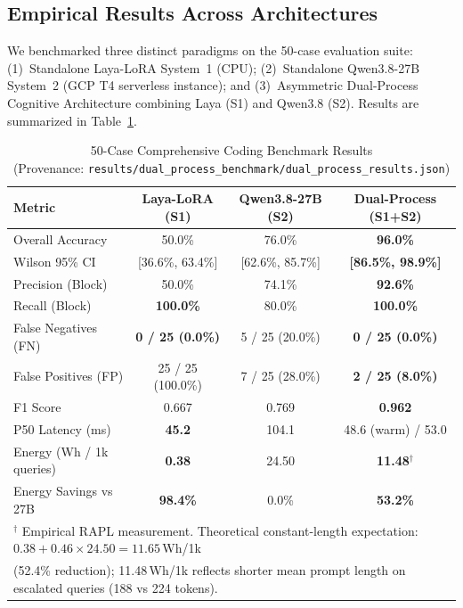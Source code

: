 \documentclass[conference]{IEEEtran}
\begin{document}
\subsection{Empirical Results Across Architectures}

We benchmarked three distinct paradigms on the 50-case evaluation suite:
(1)~Standalone Laya-LoRA System~1 (CPU);
(2)~Standalone Qwen3.8-27B System~2 (GCP T4 serverless instance); and
(3)~Asymmetric Dual-Process Cognitive Architecture combining Laya (S1) and Qwen3.8 (S2).
Results are summarized in Table~\ref{tab:benchmark_50}.

\begin{table}[htbp]
\centering
\caption{50-Case Comprehensive Coding Benchmark Results\\
(Provenance: \texttt{results/dual\_process\_benchmark/dual\_process\_results.json})}
\label{tab:benchmark_50}
\begin{tabular}{@{}lccc@{}}
\toprule
\textbf{Metric} & \textbf{Laya-LoRA (S1)} & \textbf{Qwen3.8-27B (S2)} & \textbf{Dual-Process (S1+S2)} \\
\midrule
Overall Accuracy & 50.0\% & 76.0\% & \textbf{96.0\%} \\
Wilson 95\% CI & [36.6\%, 63.4\%] & [62.6\%, 85.7\%] & \textbf{[86.5\%, 98.9\%]} \\
Precision (Block) & 50.0\% & 74.1\% & \textbf{92.6\%} \\
Recall (Block) & \textbf{100.0\%} & 80.0\% & \textbf{100.0\%} \\
False Negatives (FN) & \textbf{0 / 25 (0.0\%)} & 5 / 25 (20.0\%) & \textbf{0 / 25 (0.0\%)} \\
False Positives (FP) & 25 / 25 (100.0\%) & 7 / 25 (28.0\%) & \textbf{2 / 25 (8.0\%)} \\
F1 Score & 0.667 & 0.769 & \textbf{0.962} \\
P50 Latency (ms) & \textbf{45.2} & 104.1 & 48.6 (warm) / 53.0 \\
Energy (Wh / 1k queries) & \textbf{0.38} & 24.50 & \textbf{11.48}$^\dagger$ \\
Energy Savings vs 27B & \textbf{98.4\%} & 0.0\% & \textbf{53.2\%} \\
\midrule
\multicolumn{4}{l}{$^\dagger$ Empirical RAPL measurement. Theoretical constant-length expectation: $0.38 + 0.46 \times 24.50 = 11.65$\,Wh/1k} \\
\multicolumn{4}{l}{(52.4\% reduction); 11.48\,Wh/1k reflects shorter mean prompt length on escalated queries (188 vs 224 tokens).} \\
\bottomrule
\end{tabular}
\end{table}
\end{document}

